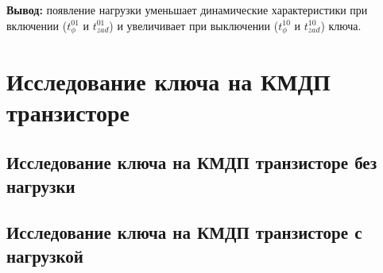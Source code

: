 \documentclass[a4paper,14pt]{article}
\begin{document}
\textbf{Вывод: } появление нагрузки уменьшает динамические характеристики при включении ($t^{01}_{\phi}$ и $t^{01}_{zad}$) и увеличивает при выключении ($t^{10}_{\phi}$ и $t^{10}_{zad}$) ключа.



\section{Исследование ключа на КМДП транзисторе}
\subsection{Исследование ключа на КМДП транзисторе без нагрузки}

\subsection{Исследование ключа на КМДП транзисторе с нагрузкой}



 
\end{document}
